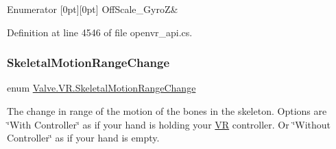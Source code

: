 \begin{DoxyEnumFields}{Enumerator}
[0pt][0pt]{}\mbox{\label{namespace_valve_1_1_v_r_a2d0383e6aef75003e408a985137e9980add02ec6ade7add12b607e667bde4880c}} 
Off\+Scale\+\_\+\+GyroZ&\\
\hline

\end{DoxyEnumFields}


Definition at line 4546 of file openvr\+\_\+api.\+cs.

\mbox{\label{namespace_valve_1_1_v_r_aabb506007a41244de5c315ff5519439f}} 
\subsubsection{\texorpdfstring{SkeletalMotionRangeChange}{SkeletalMotionRangeChange}}
{\footnotesize\ttfamily enum \mbox{\hyperlink{namespace_valve_1_1_v_r_aabb506007a41244de5c315ff5519439f}{Valve.\+V\+R.\+Skeletal\+Motion\+Range\+Change}}\hspace{0.3cm}{\ttfamily [strong]}}



The change in range of the motion of the bones in the skeleton. Options are \char`\"{}\+With Controller\char`\"{} as if your hand is holding your \mbox{\hyperlink{namespace_valve_1_1_v_r}{VR}} controller. Or \char`\"{}\+Without Controller\char`\"{} as if your hand is empty. 

